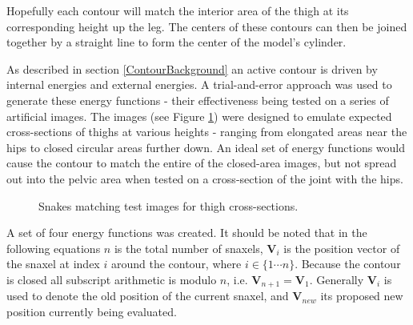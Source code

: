 Hopefully each contour will match the interior area of the thigh at its corresponding height up the leg.
The centers of these contours can then be joined together by a straight line to form the center of the model's cylinder.

As described in section \ref{ContourBackground} an active contour is driven by internal energies and external energies.
A trial-and-error approach was used to generate these energy functions - their effectiveness being tested on a series of artificial images.
The images (see Figure \ref{Contours}) were designed to emulate expected cross-sections of thighs at various heights - ranging from elongated areas
near the hips to closed circular areas further down.
An ideal set of energy functions would cause the contour to match the entire of the closed-area images, but not spread out into
the pelvic area when tested on a cross-section of the joint with the hips.

\begin{figure}[tb]
	\vspace{-10pt}
	\centering
	\quad
	\caption{Snakes matching test images for thigh cross-sections.}
	\label{Contours}
\end{figure}

\bigskip
\noindent A set of four energy functions was created.  It should be noted that in the following equations $n$ is the total number of snaxels,
$\mathbf{V}_{i}$ is the position vector of the snaxel at index $i$ around the contour, where $i \in \{1 \cdots n\}$.
Because the contour is closed all subscript arithmetic is modulo $n$, i.e. $\mathbf{V}_{n+1} = \mathbf{V}_{1}$.
Generally $\mathbf{V}_{i}$ is used to denote the old position of the current snaxel, and $\mathbf{V}_{new}$ its proposed new position
currently being evaluated.

